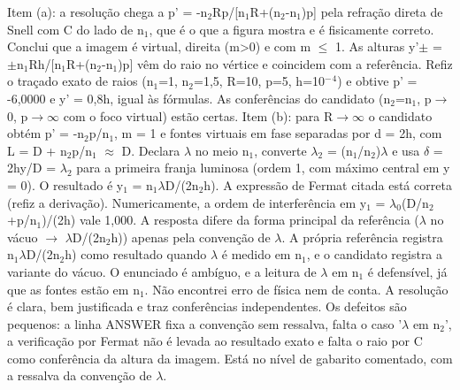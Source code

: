 \documentclass{article}%
\begin{document}
Item (a): a resolução chega a p' = -n$_{2}$Rp/{[}n$_{1}$R+(n$_{2}$-n$_{1}$)p{]} pela refração direta de Snell com C do lado de n$_{1}$, que é o que a figura mostra e é fisicamente correto. Conclui que a imagem é virtual, direita (m>0) e com m $\leq$ 1. As alturas y'$\pm$ = $\pm$n$_{1}$Rh/{[}n$_{1}$R+(n$_{2}$-n$_{1}$)p{]} vêm do raio no vértice e coincidem com a referência. Refiz o traçado exato de raios (n$_{1}$=1, n$_{2}$=1,5, R=10, p=5, h=10$^{-}$$^{4}$) e obtive p' = -6,0000 e y' = 0,8h, igual às fórmulas. As conferências do candidato (n$_{2}$=n$_{1}$, p$\to$0, p$\to$$\infty$ com o foco virtual) estão certas. Item (b): para R$\to$$\infty$ o candidato obtém p' = -n$_{2}$p/n$_{1}$, m = 1 e fontes virtuais em fase separadas por d = 2h, com L = D + n$_{2}$p/n$_{1}$ $\approx$ D. Declara $\lambda$ no meio n$_{1}$, converte $\lambda$$_{2}$ = (n$_{1}$/n$_{2}$)$\lambda$ e usa $\delta$ = 2hy/D = $\lambda$$_{2}$ para a primeira franja luminosa (ordem 1, com máximo central em y = 0). O resultado é y$_{1}$ = n$_{1}$$\lambda$D/(2n$_{2}$h). A expressão de Fermat citada está correta (refiz a derivação). Numericamente, a ordem de interferência em y$_{1}$ = $\lambda$$_{0}$(D/n$_{2}$+p/n$_{1}$)/(2h) vale 1,000. A resposta difere da forma principal da referência ($\lambda$ no vácuo $\to$ $\lambda$D/(2n$_{2}$h)) apenas pela convenção de $\lambda$. A própria referência registra n$_{1}$$\lambda$D/(2n$_{2}$h) como resultado quando $\lambda$ é medido em n$_{1}$, e o candidato registra a variante do vácuo. O enunciado é ambíguo, e a leitura de $\lambda$ em n$_{1}$ é defensível, já que as fontes estão em n$_{1}$. Não encontrei erro de física nem de conta. A resolução é clara, bem justificada e traz conferências independentes. Os defeitos são pequenos: a linha ANSWER fixa a convenção sem ressalva, falta o caso '$\lambda$ em n$_{2}$', a verificação por Fermat não é levada ao resultado exato e falta o raio por C como conferência da altura da imagem. Está no nível de gabarito comentado, com a ressalva da convenção de $\lambda$.%
\end{document}
